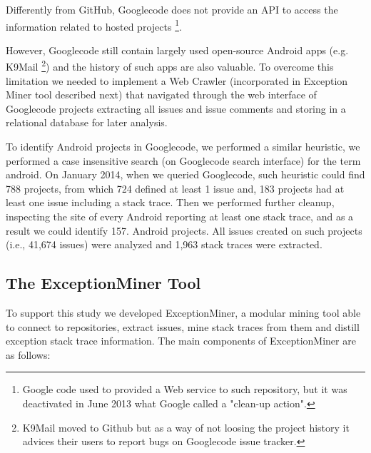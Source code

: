 \documentclass[conference]{IEEEtran}
\begin{document}
Differently from GitHub, Googlecode does not provide an API to access the information related
 to hosted projects \footnote{Google code used to provided a Web service to such repository, but it was deactivated in June 2013 what Google called a "clean-up action".}.

However, Googlecode still contain largely used open-source Android apps (e.g. K9Mail \footnote{K9Mail moved to Github but as a way of not loosing the project history 
it advices their users to report bugs on Googlecode issue tracker.})  and the history of such apps are also valuable. 
To overcome this limitation we needed to implement a Web Crawler (incorporated in Exception Miner tool described next) that navigated 
through the web interface of Googlecode projects extracting all issues and issue comments and storing in a relational database for later analysis.

To identify Android projects in Googlecode, we performed a similar heuristic, we performed a case insensitive search 
(on Googlecode search interface) for the term \textsf{android}.  On January 2014, when we queried Googlecode, such heuristic could
 find 788  projects, from which 724 defined at least 1 issue and, 183 projects 
had at least one issue including a stack trace. Then we performed further cleanup, inspecting the site of every Android
reporting at least one stack trace, and as a result we could identify 157. 
Android projects.  All issues created on such projects (i.e., 41,674 issues) were analyzed and 1,963 stack traces 
were extracted.



\subsection{The ExceptionMiner Tool}
\label{sec:exceptionminer}

To support this study we developed ExceptionMiner, a modular mining tool able 
to connect to repositories, extract issues, mine stack traces from
them and distill exception stack trace information. The main components of
ExceptionMiner are as follows:
\end{document}
